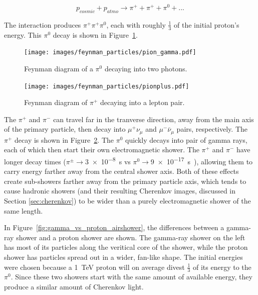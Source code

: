   \begin{equation}\label{eqn:protoncollision}
    p_{cosmic} + p_{atmo} \rightarrow \pi^+ + \pi^+ + \pi^0 + ...
  \end{equation}
  
  The interaction produces $\pi^+\pi^+\pi^0$, each with roughly \nicetilde $\frac{1}{3}$ of the initial proton's energy.
  This $\pi^{0}$ decay is shown in Figure~\ref{fig:feynman_pi0}.
  
  \begin{figure}[ht]
    \centering
    \texttt{[image: images/feynman\_particles/pion\_gamma.pdf]}
    \caption[Feynman Diagram of $\pi^{0}$ Decay]{
      Feynman diagram of a $\pi^{0}$ decaying into two photons.
      \CaptionBlankLine
    }
    \label{fig:feynman_pi0}
  \end{figure}

  \begin{figure}[ht]
    \centering
    \texttt{[image: images/feynman\_particles/pionplus.pdf]}
    \caption[Feynman Diagram of $\pi^{+}$ Decay]{
      Feynman diagram of $\pi^{+}$ decaying into a lepton pair.
      \CaptionBlankLine
    }
    \label{fig:feynman_piplus}
  \end{figure}
  
  The $\pi^{+}$ and $\pi^{-}$ can travel far in the tranverse direction, away from the main axis of the primary particle, then decay into $\mu^{+}\nu_{\mu}$ and $\mu^{-}\bar{\nu}_{\mu}$ pairs, respectively.
  The $\pi^{+}$ decay is shown in Figure~\ref{fig:feynman_piplus}.
  The $\pi^{0}$ quickly decays into pair of gamma rays, each of which then start their own electromagnetic shower.
  The $\pi^{+}$ and $\pi^{-}$ have longer decay times ($\pi^{\pm} \rightarrow $\SI{3e-8}{s} vs $\pi^{0} \rightarrow $\SI{9e-17}{s}~\cite{pdg_2014}), allowing them to carry energy farther away from the central shower axis.
  Both of these effects create sub-showers farther away from the primary particle axis, which tends to cause hadronic showers (and their resulting Cherenkov images, discussed in Section \ref{sec:cherenkov}) to be wider than a purely electromagnetic shower of the same length. 
  
  In Figure~\ref{fig:gamma_vs_proton_airshower}, the differences between a gamma-ray shower and a proton shower are shown.
  The gamma-ray shower on the left has most of its particles along the veritical core of the shower, while the proton shower has particles spread out in a wider, fan-like shape.
  The initial energies were chosen because a \SI{1}{TeV} proton will on average divest $\frac{1}{3}$ of its energy to the $\pi^{0}$.
  Since these two showers start with the same amount of available energy, they produce a similar amount of Cherenkov light.

